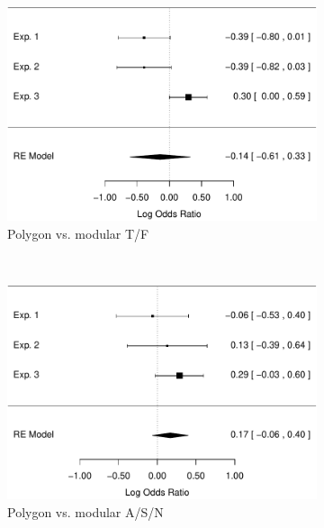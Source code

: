 \documentclass[man,10pt]{apa6}
\begin{document}
\begin{figure}
\centering
\begin{subfigure}[c]{0.4\textwidth}
\centering
\includegraphics[width=\textwidth]{figures/meta/question_typegenerator_TF_n_conditionpolygon.pdf}
\caption{Polygon vs. modular T/F}
\end{subfigure}
~
\begin{subfigure}[c]{0.4\textwidth}
\centering
\includegraphics[width=\textwidth]{figures/meta/question_typegenerator_ASN_n_conditionpolygon.pdf}
\caption{Polygon vs. modular A/S/N}
\end{subfigure} \\
\centering
\begin{subfigure}[c]{0.4\textwidth}
\centering

\end{subfigure}
\end{figure}
\end{document}
